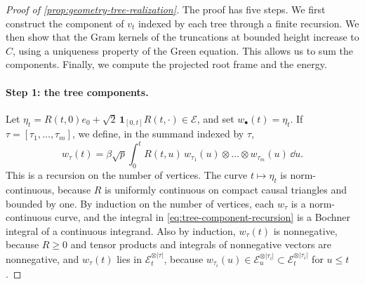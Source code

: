 \begin{proof}[Proof of \cref{prop:geometry-tree-realization}]
The proof has five steps. We first construct the component of $v_t$ indexed by each tree through a finite recursion. We then show that the Gram kernels of the truncations at bounded height increase to $C$, using a uniqueness property of the Green equation. This allows us to sum the components. Finally, we compute the projected root frame and the energy.

\paragraph{Step 1: the tree components.}
Let $\eta_t=R(t,0)e_0+\sqrt2\,\mathbf 1_{[0,t]}R(t,\cdot)\in\mathcal E$, and set $w_\bullet(t)=\eta_t$. If $\tau=[\tau_1,\dots,\tau_m]$, we define, in the summand indexed by $\tau$,
\begin{equation}\label{eq:tree-component-recursion}
 w_\tau(t)=\beta\sqrt p\int_0^tR(t,u)\,w_{\tau_1}(u)\otimes\dots\otimes w_{\tau_m}(u)\,\dd u.
\end{equation}
This is a recursion on the number of vertices. The curve $t\mapsto\eta_t$ is norm-continuous, because $R$ is uniformly continuous on compact causal triangles and bounded by one. By induction on the number of vertices, each $w_\tau$ is a norm-continuous curve, and the integral in \eqref{eq:tree-component-recursion} is a Bochner integral of a continuous integrand. Also by induction, $w_\tau(t)$ is nonnegative, because $R\ge0$ and tensor products and integrals of nonnegative vectors are nonnegative, and $w_\tau(t)$ lies in $\mathcal E_t^{\otimes|\tau|}$, because $w_{\tau_i}(u)\in\mathcal E_u^{\otimes|\tau_i|}\subset\mathcal E_t^{\otimes|\tau_i|}$ for $u\le t$.


\end{proof}
